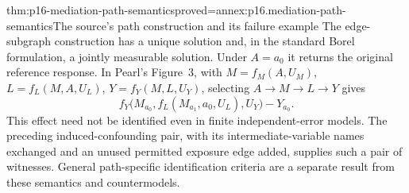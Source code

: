 \begin{hbtheorem}{thm:p16-mediation-path-semantics}{proved=annex:p16.mediation-path-semantics}{The source's path construction and its failure example}
The edge-subgraph construction has a unique solution and, in the
standard Borel formulation, a jointly measurable solution. Under
\(A=a_0\) it returns the original reference response. In Pearl's
Figure~3, with \(M=f_M(A,U_M)\), \(L=f_L(M,A,U_L)\),
\(Y=f_Y(M,L,U_Y)\), selecting \(A\to M\to L\to Y\) gives
\[
 f_Y\bigl(M_{a_0},f_L(M_{a_1},a_0,U_L),U_Y\bigr)-Y_{a_0}.
\]
This effect need not be identified even in finite independent-error models.
The preceding induced-confounding pair, with its intermediate-variable
names exchanged and an unused permitted exposure edge added, supplies
such a pair of witnesses. General path-specific identification criteria
are a separate result from these semantics and countermodels.
\end{hbtheorem}
